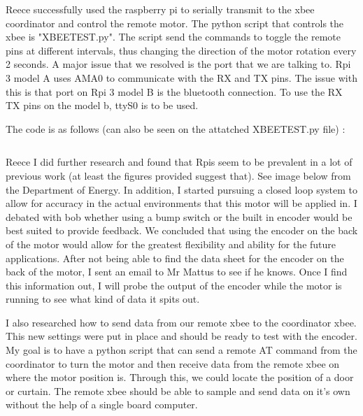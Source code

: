 \documentclass[fontsize=11pt, %
                             paper=letter, %
                             twoside, %
                             captions=tableheading,
                             index=totoc,
                             hyperref]{labbook}
\begin{document}
Reece successfully used the raspberry pi to serially transmit to the xbee coordinator and control the remote motor. The python script that controls the xbee is "XBEETEST.py". The script send the commands to toggle the remote pins at different intervals, thus changing the direction of the motor rotation every 2 seconds. A major issue that we resolved is the port that we are talking to. Rpi 3 model A uses AMA0 to communicate with the RX and TX pins. The issue with this is that port on Rpi 3 model B is the bluetooth connection. To use the RX TX pins on the model b, ttyS0 is to be used. 

The code is as follows (can also be seen on the attatched XBEETEST.py file) : 

\begin{mdframed}[backgroundcolor=yellow!5, roundcorner=10pt,outerlinecolor= blue!70!black,outerlinewidth=1.2,frametitle=XBEETEST.py]
\inputminted[linenos=true]{python}{codeFiles/pythonCode/xbeeTest.py}
\end{mdframed}


Reece 
\newline I did further research and found that Rpis seem to be prevalent in a lot of previous work (at least the figures provided suggest that). See image below from the Department of Energy.
In addition, I started pursuing a closed loop system to allow for accuracy in the actual environments that this motor will be applied in. I debated with bob whether using a bump switch or the built in encoder would be best suited to provide feedback. We concluded that using the encoder on the back of the motor would allow for the greatest flexibility and ability for the future applications. After not being able to find the data sheet for the encoder on the back of the motor, I sent an email to Mr Mattus to see if he knows. Once I find this information out, I will probe the output of the encoder while the motor is running to see what kind of data it spits out. 

I also researched how to send data from our remote xbee to the coordinator xbee. This new settings were put in place and should be ready to test with the encoder. My goal is to have a python script that can send a remote AT command from the coordinator to turn the motor and then receive data from the remote xbee on where the motor position is. Through this, we could locate the position of a door or curtain. The remote xbee should be able to sample and send data on it's own without the help of a single board computer. 
\end{document}
